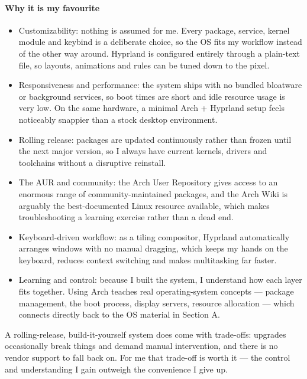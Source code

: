 \paragraph{Why it is my favourite}
\begin{itemize}
    \item Customizability: nothing is assumed for me. Every package, service, kernel module and keybind is a deliberate choice, so the OS fits my workflow instead of the other way around. Hyprland is configured entirely through a plain-text file, so layouts, animations and rules can be tuned down to the pixel.
    \item Responsiveness and performance: the system ships with no bundled bloatware or background services, so boot times are short and idle resource usage is very low. On the same hardware, a minimal Arch + Hyprland setup feels noticeably snappier than a stock desktop environment.
    \item Rolling release: packages are updated continuously rather than frozen until the next major version, so I always have current kernels, drivers and toolchains without a disruptive reinstall.
    \item The AUR and community: the Arch User Repository gives access to an enormous range of community-maintained packages, and the Arch Wiki is arguably the best-documented Linux resource available, which makes troubleshooting a learning exercise rather than a dead end.
    \item Keyboard-driven workflow: as a tiling compositor, Hyprland automatically arranges windows with no manual dragging, which keeps my hands on the keyboard, reduces context switching and makes multitasking far faster.
    \item Learning and control: because I built the system, I understand how each layer fits together. Using Arch teaches real operating-system concepts — package management, the boot process, display servers, resource allocation — which connects directly back to the OS material in Section A.
\end{itemize}
A rolling-release, build-it-yourself system does come with trade-offs: upgrades occasionally break things and demand manual intervention, and there is no vendor support to fall back on. For me that trade-off is worth it — the control and understanding I gain outweigh the convenience I give up.


